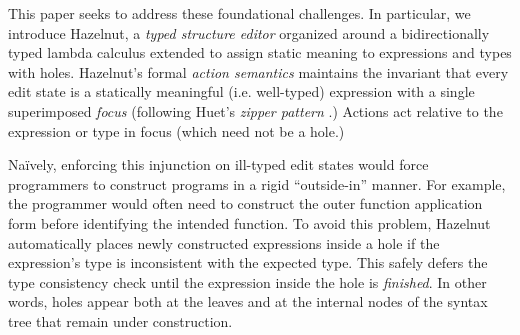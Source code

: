 


This paper seeks to address these foundational challenges. In particular, we introduce Hazelnut,  a \emph{typed structure editor}  organized around a bidirectionally typed lambda calculus extended to assign static meaning to expressions and types with {holes}. Hazelnut's formal \emph{action semantics} maintains the invariant that every edit state is a statically meaningful (i.e. well-typed) expression with a single superimposed \emph{focus} (following Huet's \emph{zipper pattern} \cite{JFP::Huet1997}.) Actions act relative to the expression or type in focus (which need not be a hole.)  %

Na\"ively, enforcing this injunction on ill-typed edit states would force programmers to construct programs in a rigid ``outside-in'' manner. For example, the programmer would often need to construct the outer function application form before identifying the intended function. To avoid this problem, Hazelnut automatically places newly constructed expressions inside a hole if the expression's type is inconsistent with the expected type. This safely defers the type consistency check until the expression inside the hole is \emph{finished}. In other words, holes appear both at the leaves and at the internal nodes of the syntax tree that remain under construction. %

